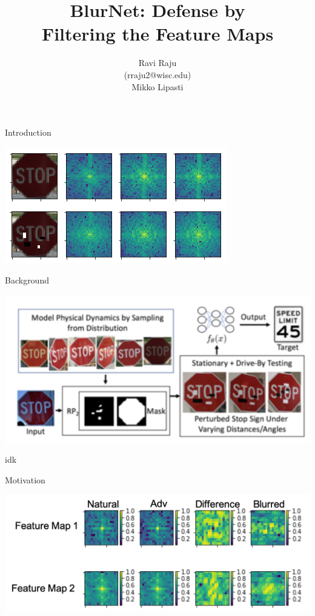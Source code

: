 \documentclass{pharmposter}
\title{BlurNet: Defense by \\Filtering the Feature Maps}
\author{Ravi Raju \\ {\Large(rraju2@wisc.edu)} \\ Mikko Lipasti}
\begin{document}
	\begin{sectionbox}{Introduction}

	\begin{center}
		\includegraphics[scale=2.0]{regular_blur.png}
	\end{center}
	\end{sectionbox}

	\begin{sectionbox}{Background}
		\begin{center}
		\includegraphics[scale=1.5]{RP2.png}
		\end{center}
	\end{sectionbox}

	\begin{sectionbox}{idk}
		\lipsum[2]
	\end{sectionbox}

	\begin{sectionbox}{Motivation}
		\lipsum[2]
		\begin{center}
		\includegraphics[scale=1.5]{fft_feat_maps_labeled.png}
		\end{center}
	\end{sectionbox}
\end{document}
